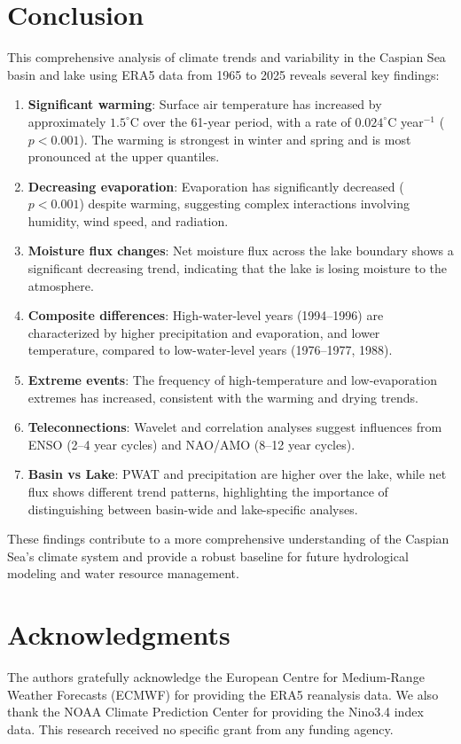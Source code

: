\documentclass[12pt,a4paper]{article}
\begin{document}
\section{Conclusion}
This comprehensive analysis of climate trends and variability in the Caspian Sea basin and lake using ERA5 data from 1965 to 2025 reveals several key findings:
\begin{enumerate}
    \item \textbf{Significant warming}: Surface air temperature has increased by approximately $1.5^\circ$C over the 61-year period, with a rate of $0.024^\circ$C year$^{-1}$ ($p<0.001$). The warming is strongest in winter and spring and is most pronounced at the upper quantiles.
    \item \textbf{Decreasing evaporation}: Evaporation has significantly decreased ($p<0.001$) despite warming, suggesting complex interactions involving humidity, wind speed, and radiation.
    \item \textbf{Moisture flux changes}: Net moisture flux across the lake boundary shows a significant decreasing trend, indicating that the lake is losing moisture to the atmosphere.
    \item \textbf{Composite differences}: High-water-level years (1994–1996) are characterized by higher precipitation and evaporation, and lower temperature, compared to low-water-level years (1976–1977, 1988).
    \item \textbf{Extreme events}: The frequency of high-temperature and low-evaporation extremes has increased, consistent with the warming and drying trends.
    \item \textbf{Teleconnections}: Wavelet and correlation analyses suggest influences from ENSO (2–4 year cycles) and NAO/AMO (8–12 year cycles).
    \item \textbf{Basin vs Lake}: PWAT and precipitation are higher over the lake, while net flux shows different trend patterns, highlighting the importance of distinguishing between basin-wide and lake-specific analyses.
\end{enumerate}
These findings contribute to a more comprehensive understanding of the Caspian Sea's climate system and provide a robust baseline for future hydrological modeling and water resource management.

\section*{Acknowledgments}
The authors gratefully acknowledge the European Centre for Medium-Range Weather Forecasts (ECMWF) for providing the ERA5 reanalysis data. We also thank the NOAA Climate Prediction Center for providing the Nino3.4 index data. This research received no specific grant from any funding agency.
\end{document}
